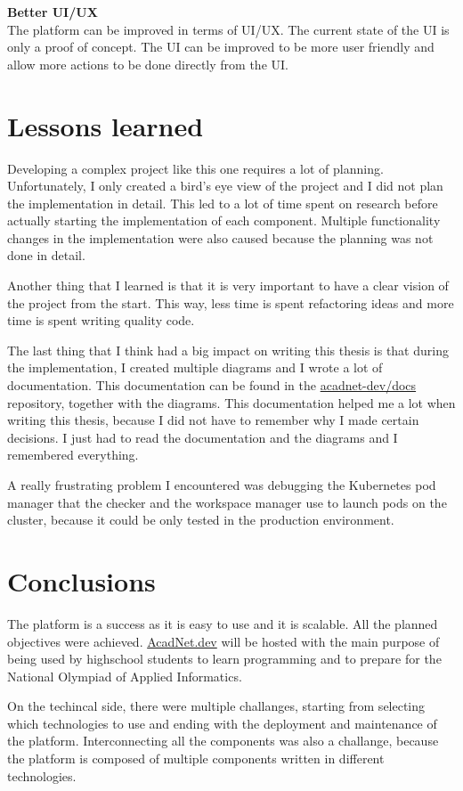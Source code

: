 \documentclass[12pt,a4paper]{report}
\begin{document}
\textbf{Better UI/UX}
\\
The platform can be improved in terms of UI/UX. The current state of the UI is only a proof of concept. The UI can be improved to be more user friendly and allow more actions to be done directly from the UI.

\newpage
\section{Lessons learned}
Developing a complex project like this one requires a lot of planning. Unfortunately, I only created a bird's eye view of the project and I did not plan the implementation in detail. This led to a lot of time spent on research before actually starting the implementation of each component. Multiple functionality changes in the implementation were also caused because the planning was not done in detail. 

Another thing that I learned is that it is very important to have a clear vision of the project from the start. This way, less time is spent refactoring ideas and more time is spent writing quality code.

The last thing that I think had a big impact on writing this thesis is that during the implementation, I created multiple diagrams and I wrote a lot of documentation. This documentation can be found in the \href{https://github.com/acadnet-dev/docs}{acadnet-dev/docs} repository, together with the diagrams. This documentation helped me a lot when writing this thesis, because I did not have to remember why I made certain decisions. I just had to read the documentation and the diagrams and I remembered everything.

A really frustrating problem I encountered was debugging the Kubernetes pod manager that the checker and the workspace manager use to launch pods on the cluster, because it could be only tested in the production environment.

\section{Conclusions}
The platform is a success as it is easy to use and it is scalable. All the planned objectives were achieved. \href{https://acadnet.dev}{AcadNet.dev} will be hosted with the main purpose of being used by highschool students to learn programming and to prepare for the National Olympiad of Applied Informatics.

On the techincal side, there were multiple challanges, starting from selecting which technologies to use and ending with the deployment and maintenance of the platform. Interconnecting all the components was also a challange, because the platform is composed of multiple components written in different technologies.
\end{document}
